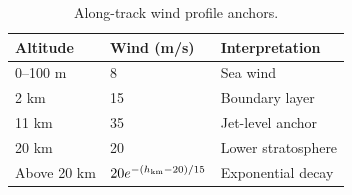 \begin{table}[htbp]
\caption{Along-track wind profile anchors.}
\label{tab:src3}
\small
\setlength{\tabcolsep}{3.5pt}
\begin{tabularx}{\linewidth}{@{}lXX@{}}
\toprule
Altitude & Wind (m/s) & Interpretation \\
\midrule
0--100 m & 8 & Sea wind \\
2 km & 15 & Boundary layer \\
11 km & 35 & Jet-level anchor \\
20 km & 20 & Lower stratosphere \\
Above 20 km & $20e^{-(h_{\rm km}-20)/15}$ & Exponential decay \\
\bottomrule
\end{tabularx}
\par{}
\end{table}
